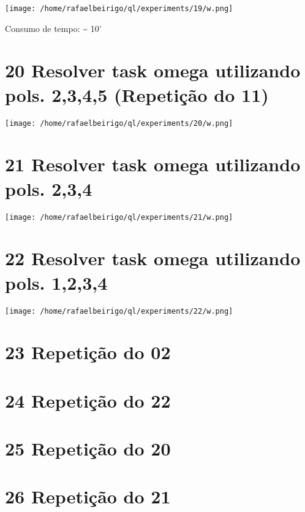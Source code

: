 \documentclass[11pt]{article}
\begin{document}
\centerline{\texttt{[image: /home/rafaelbeirigo/ql/experiments/19/w.png]}}

  Consumo de tempo: \~{} 10'


\section{20 Resolver task omega utilizando pols. 2,3,4,5 (Repetição do 11)}
\label{sec-21}

\centerline{\texttt{[image: /home/rafaelbeirigo/ql/experiments/20/w.png]}}



\section{21 Resolver task omega utilizando pols. 2,3,4}
\label{sec-22}

\centerline{\texttt{[image: /home/rafaelbeirigo/ql/experiments/21/w.png]}}



\section{22 Resolver task omega utilizando pols. 1,2,3,4}
\label{sec-23}

\centerline{\texttt{[image: /home/rafaelbeirigo/ql/experiments/22/w.png]}}



\section{23 Repetição do 02}
\label{sec-24}



\section{24 Repetição do 22}
\label{sec-25}



\section{25 Repetição do 20}
\label{sec-26}



\section{26 Repetição do 21}
\label{sec-27}
\end{document}
